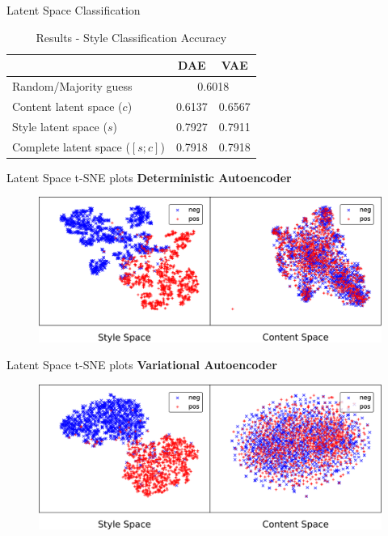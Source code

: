\documentclass[aspectratio=169]{beamer}
\newcommand{\tabh}[1]{\multicolumn{1}{c|}{\textbf{#1}}}
\begin{document}
\begin{frame}{Latent Space Classification}
	\begin{table}[ht]
		\centering
		\begin{tabular}{| l | r | r |}
			\hline
			                                & \tabh{DAE}                  & \tabh{VAE} \\
			\hline \hline
			Random/Majority guess           & \multicolumn{2}{c|}{0.6018}              \\ \hline \hline
			Content latent space  ($c$)     & 0.6137                      & 0.6567     \\ \hline
			Style latent space ($s$)        & 0.7927                      & 0.7911     \\ \hline
			Complete latent space ($[s;c]$) & 0.7918                      & 0.7918     \\
			\hline
		\end{tabular}
		\caption{Results - Style Classification Accuracy}
		\label{tab:latent-space-classification}
	\end{table}

\end{frame}

\begin{frame}{Latent Space t-SNE plots}
	\centering
	\textbf{Deterministic Autoencoder}

	\begin{figure}[ht]
		\includegraphics[width=\textwidth]{images/dae-latent-spaces}
	\end{figure}
\end{frame}

\begin{frame}{Latent Space t-SNE plots}
	\centering
	\textbf{Variational Autoencoder}

	\begin{figure}[ht]
		\includegraphics[width=\textwidth]{images/vae-latent-spaces}
	\end{figure}
\end{frame}
\end{document}

